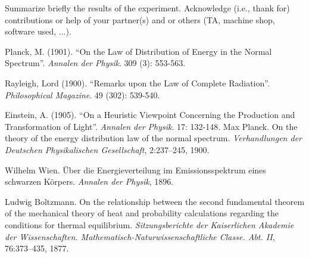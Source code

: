 \documentclass[10pt,letterpaper,onecolumn]{article}
\begin{document}
Summarize briefly the results of the experiment.
Acknowledge (i.e., thank for) contributions or help
of your partner(s) and or
others (TA, machine shop, software used, ...).


\begin{thebibliography}{9}

Planck, M. (1901). ``On the Law of Distribution of Energy in the Normal Spectrum''. \textit{Annalen der Physik}. 309 (3): 553-563.
  
  Rayleigh, Lord (1900). ``Remarks upon the Law of Complete Radiation''. \textit{Philosophical Magazine}. 49 (302): 539-540.
  
  Einstein, A. (1905). ``On a Heuristic Viewpoint Concerning the Production and Transformation of Light''. \textit{Annalen der Physik}. 17: 132-148.
Max Planck.
\newblock On the theory of the energy distribution law of the normal spectrum.
\newblock \emph{Verhandlungen der Deutschen Physikalischen Gesellschaft}, 2:237–245, 1900.

Wilhelm Wien.
\newblock Über die Energieverteilung im Emissionsspektrum eines schwarzen Körpers.
\newblock \emph{Annalen der Physik}, 1896.

Ludwig Boltzmann.
\newblock On the relationship between the second fundamental theorem of the mechanical theory of heat and probability calculations regarding the conditions for thermal equilibrium.
\newblock \emph{Sitzungsberichte der Kaiserlichen Akademie der Wissenschaften. Mathematisch-Naturwissenschaftliche Classe. Abt. II}, 76:373–435, 1877.


\end{thebibliography}
\end{document}
